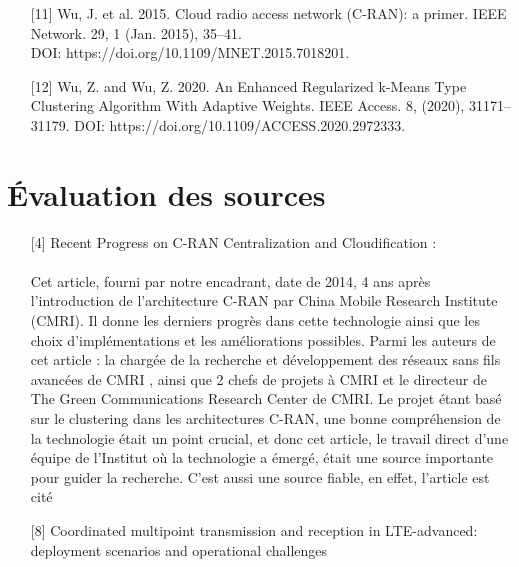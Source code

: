 \documentclass{article}
\begin{document}
\begin{enumerate}
\item[{[11]}] Wu, J. et al. 2015. Cloud radio access network (C-RAN): a primer. IEEE Network. 29, 1 (Jan. 2015), 35–41.\\DOI: https://doi.org/10.1109/MNET.2015.7018201.
\item[{[12]}] Wu, Z. and Wu, Z. 2020. An Enhanced Regularized k-Means Type Clustering Algorithm With Adaptive Weights. IEEE Access. 8, (2020), 31171–31179. DOI: https://doi.org/10.1109/ACCESS.2020.2972333.
\end{enumerate}
\section{Évaluation des sources}
\begin{itemize}
  \item [{[4]}] Recent Progress on C-RAN Centralization and Cloudification :
  \paragraph{}

  Cet article, fourni par notre encadrant, date de 2014, 4 ans après l'introduction 
  de l'architecture C-RAN par China Mobile Research Institute (CMRI). Il donne les 
  derniers progrès dans cette technologie ainsi que les choix d’implémentations et 
  les améliorations possibles. Parmi les auteurs de cet article : la chargée de la 
  recherche et développement des réseaux sans fils avancées de CMRI , ainsi que 2 chefs 
  de projets à CMRI et le directeur de The Green Communications Research Center de CMRI. 
  Le projet étant basé sur le clustering dans les architectures C-RAN, une bonne compréhension 
  de la technologie était un point crucial, et donc cet article, le travail direct d’une équipe 
  de l'Institut où la technologie a émergé, était une source importante pour guider la recherche.
  C'est aussi une source fiable, en effet, l'article est cité \\
  \item [{[8]}] Coordinated multipoint transmission and reception in LTE-advanced: deployment scenarios and operational challenges

\end{itemize}
\end{document}
